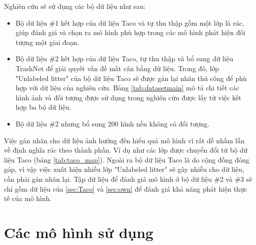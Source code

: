 \documentclass[../the.tex]{subfiles}
\begin{document}
{\fontsize{13}{12} \selectfont
Nghiên cứu sẽ sử dụng các bộ dữ liệu như sau:
\begin{itemize}
	\item Bộ dữ liệu \#1 kết hợp của dữ liệu Taco và tự thu thập gồm một lớp là rác, giúp đánh giá và chọn ra mô hình phù hợp trong các mô hình phát hiện đối tượng một giai đoạn.
	\item Bộ dữ liệu \#2 kết hợp của dữ liệu Taco, tự thu thập và bổ sung dữ liệu TrashNet để giải quyết vấn đề mất cân bằng dữ liệu. 
	Trong đó, lớp "Unlabeled litter" của bộ dữ liệu Taco sẽ được gán lại nhãn thủ công để phù hợp với dữ liệu của nghiên cứu. Bảng \ref{tab:datasetmain} mô tả chi tiết các hình ảnh và đối tượng được sử dụng trong nghiên cứu được lấy từ việc kết hợp ba bộ dữ liệu.\label{item:dataset}
	\item Bộ dữ liệu \#2 nhưng bổ sung 200 hình nền không có đối tượng.
\end{itemize}
\bigskip

Việc gán nhãn cho dữ liệu ảnh hưởng đến hiểu quả mô hình vì rất dễ nhầm lẫn về định nghĩa rác theo thành phần. Ví dụ như các lớp được chuyển đổi từ bộ dữ liệu Taco (bảng \ref{tab:taco_map}).
Ngoài ra bộ dữ liệu Taco là do cộng đồng đóng góp, vì vậy việc xuất hiện nhiều lớp "Unlabeled litter" sẽ gây nhiễu cho dữ liệu, cần phải gán nhãn lại.
Tập dữ liệu để đánh giá mô hình ở bộ dữ liệu \#2 và \#3 sẽ chỉ gồm dữ liệu của \ref{sec:Taco} và \ref{sec:own} để đánh giá khả năng phát hiện thực tế của mô hình.
}


\section{Các mô hình sử dụng}
\label{sec:model} 
\end{document}
